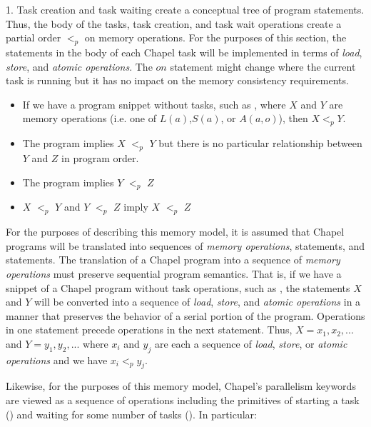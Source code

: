 1. Task creation and task waiting create a conceptual tree of program
statements. Thus, the body of the tasks, task creation, and task wait
operations create a partial order $<_p$ on memory operations.  
For the purposes of this section, the statements in the body of each
Chapel task will be implemented in terms of \textit{load}, \textit{store}, and
\textit{atomic operations}. The $on$ statement might change where the current
task is running but it has no impact on the memory consistency requirements.

\begin{itemize}

  \item If we have a program snippet without tasks, such as , where
$X$ and $Y$ are memory operations (i.e. one of $L(a)$,$S(a)$, or $A(a,o)$), then
$X <_p Y$.

  \item The program  implies $X$ $<_p$ $Y$ but there is
no particular relationship between $Y$ and $Z$ in program order.

  \item {} The program  implies $Y$ $<_p$ $Z$
  \item $X$ $<_p$ $Y$ and $Y$ $<_p$ $Z$ imply $X$ $<_p$ $Z$
\end{itemize}

For the purposes of describing this memory model, it is assumed that Chapel
programs will be translated into sequences of \textit{memory operations},
 statements, and  statements. The translation of a
Chapel program into a sequence of \textit{memory operations} must preserve
sequential program semantics. That is, if we have a snippet of a Chapel program
without task operations, such as , the statements $X$ and $Y$ will
be converted into a sequence of \textit{load}, \textit{store}, and
\textit{atomic operations} in a manner that preserves the behavior of a serial
portion of the program. Operations in one statement precede operations in the
next statement.  Thus, $X=x_1,x_2,...$ and $Y=y_1,y_2,...$ where $x_i$ and
$y_j$ are each a sequence of \textit{load}, \textit{store}, or \textit{atomic
operations} and we have $x_i <_p y_j$.

Likewise, for the purposes of this memory model, Chapel's parallelism keywords
are viewed as a sequence of operations including the primitives of starting a
task () and waiting for some number of tasks
(). In particular:

